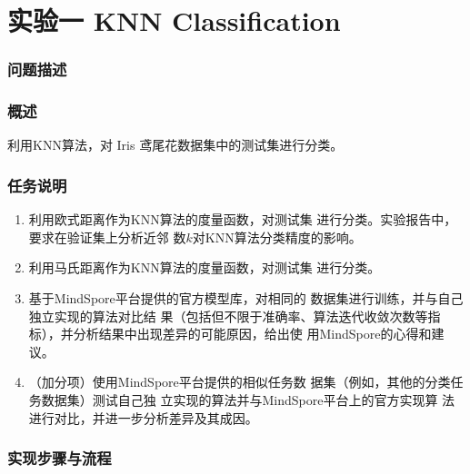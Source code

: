 \documentclass[12pt]{article}
\begin{document}
\newpage
\tableofcontents

\newpage
\part{\centering 实验一 KNN Classification}

\section{问题描述}
\section{概述}
利用KNN算法，对 Iris 鸢尾花数据集中的测试集进行分类。
\section{任务说明}
\begin{enumerate}
  \item 利用欧式距离作为KNN算法的度量函数，对测试集
        进行分类。实验报告中，要求在验证集上分析近邻
        数$k$对KNN算法分类精度的影响。
  \item 利用马氏距离作为KNN算法的度量函数，对测试集
        进行分类。
  \item 基于MindSpore平台提供的官方模型库，对相同的
        数据集进行训练，并与自己独立实现的算法对比结
        果（包括但不限于准确率、算法迭代收敛次数等指
        标），并分析结果中出现差异的可能原因，给出使
        用MindSpore的心得和建议。
  \item （加分项）使用MindSpore平台提供的相似任务数
        据集（例如，其他的分类任务数据集）测试自己独
        立实现的算法并与MindSpore平台上的官方实现算
        法进行对比，并进一步分析差异及其成因。
\end{enumerate}

\section{实现步骤与流程}
\end{document}
